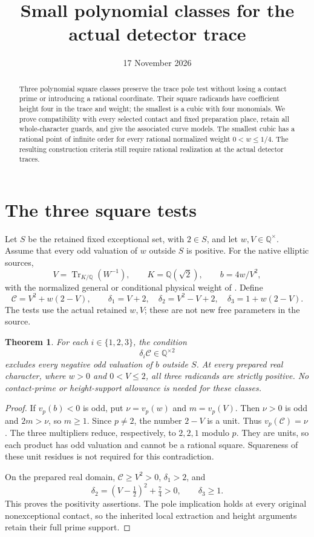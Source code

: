 \documentclass[11pt,a4paper]{article}
\title{Small polynomial classes for the actual detector trace}
\author{}\date{17 November 2026}
\newtheorem{theorem}{Theorem}[section]
\newcommand{\Q}{\mathbb Q}\newcommand{\Z}{\mathbb Z}
\DeclareMathOperator{\Tr}{Tr}\DeclareMathOperator{\Nm}{N}
\begin{document}
\maketitle
\begin{abstract}
Three polynomial square classes preserve the trace pole test without
losing a contact prime or introducing a rational coordinate. Their
square radicands have coefficient height four in the trace and weight;
the smallest is a cubic with four monomials. We prove compatibility
with every selected contact and fixed preparation place, retain all
whole-character guards, and give the associated curve models. The smallest
cubic has a rational point of infinite order for every rational normalized
weight $0<w\le1/4$. The
resulting construction criteria still require rational realization at
the actual detector traces.
\end{abstract}

\section{The three square tests}

Let $S$ be the retained fixed exceptional set, with $2\in S$, and
let $w,V\in\Q^\times$. Assume that every odd valuation of $w$
outside $S$ is positive. For the native elliptic sources,
\[
 V=\Tr_{K/\Q}(W^{-1}),\qquad K=\Q(\sqrt2),\qquad
 b=4w/V^2,
\]
with the normalized general or conditional physical weight of
\cite{Reweighted,Trace}. Define
\begin{equation}\label{eq:classes}
 \mathcal C=V^2+w(2-V),\qquad
 \delta_1=V+2,\quad
 \delta_2=V^2-V+2,\quad
 \delta_3=1+w(2-V).
\end{equation}
The tests use the actual retained $w,V$; these are not new free
parameters in the source.

\begin{theorem}\label{thm:pole}
For each $i\in\{1,2,3\}$, the condition
\[
                       \delta_i\mathcal C\in\Q^{\times2}
\]
excludes every negative odd valuation of $b$ outside $S$.
At every prepared real character, where $w>0$ and $0<V\le2$,
all three radicands are strictly positive. No contact-prime or
height-support allowance is needed for these classes.
\end{theorem}
\begin{proof}
If $v_p(b)<0$ is odd, put $\nu=v_p(w)$ and $m=v_p(V)$.
Then $\nu>0$ is odd and $2m>\nu$, so $m\ge1$. Since $p\ne2$,
the number $2-V$ is a unit. Thus $v_p(\mathcal C)=\nu$.
The three multipliers reduce, respectively, to $2,2,1$ modulo $p$.
They are units, so each product has odd valuation and cannot be
a rational square. Squareness of these unit residues is not
required for this contradiction.

On the prepared real domain, $\mathcal C\ge V^2>0$,
$\delta_1>2$, and
\[
 \delta_2=(V-\tfrac12)^2+\tfrac74>0,\qquad \delta_3\ge1.
\]
This proves the positivity assertions. The pole implication holds
at every original nonexceptional contact, so the inherited local
extraction and height arguments retain their full prime support.
\end{proof}
\end{document}
